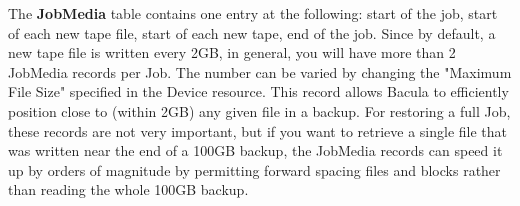 {{{\begin{longtable}{|l|l|p{2.5in}|}
\end{longtable}

The {\bf JobMedia} table contains one entry at the following: start of
the job, start of each new tape file, start of each new tape, end of the
job.  Since by default, a new tape file is written every 2GB, in general,
you will have more than 2 JobMedia records per Job.  The number can be
varied by changing the "Maximum File Size" specified in the Device
resource.  This record allows Bacula to efficiently position close to
(within 2GB) any given file in a backup.  For restoring a full Job,
these records are not very important, but if you want to retrieve
a single file that was written near the end of a 100GB backup, the
JobMedia records can speed it up by orders of magnitude by permitting
forward spacing files and blocks rather than reading the whole 100GB
backup.




}}}
